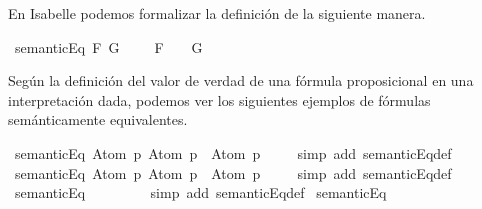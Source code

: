 \begin{isabellebody}
\begin{isamarkuptext}
  En Isabelle podemos formalizar la definición de la siguiente manera.%
\end{isamarkuptext}\isamarkuptrue%
\isamarkupfalse%
\ {\isachardoublequoteopen}semanticEq\ F\ G\ {\isasymequiv}\ {\isasymforall}{\isasymA}{\isachardot}\ {\isacharparenleft}{\isasymA}\ {\isasymTurnstile}\ F{\isacharparenright}\ {\isasymlongleftrightarrow}\ {\isacharparenleft}{\isasymA}\ {\isasymTurnstile}\ G{\isacharparenright}{\isachardoublequoteclose}%
\begin{isamarkuptext}%
Según la definición del valor de verdad de una fórmula proposicional en una 
  interpretación dada, podemos ver los siguientes ejemplos de fórmulas semánticamente equivalentes.%
\end{isamarkuptext}\isamarkuptrue%
\isamarkupfalse%
\ {\isachardoublequoteopen}semanticEq\ {\isacharparenleft}Atom\ p{\isacharparenright}\ {\isacharparenleft}{\isacharparenleft}Atom\ p{\isacharparenright}\ \isactrlbold {\isasymor}\ {\isacharparenleft}Atom\ p{\isacharparenright}{\isacharparenright}{\isachardoublequoteclose}\ \isanewline
%
\isadelimproof
\ \ %
\endisadelimproof
%
\isatagproof
{}\isamarkupfalse%
\ {\isacharparenleft}simp\ add{\isacharcolon}\ semanticEq{\isacharunderscore}def{\isacharparenright}%
\endisatagproof
{\isafoldproof}%
%
\isadelimproof
\isanewline
%
\endisadelimproof
\isanewline
{}\isamarkupfalse%
\ {\isachardoublequoteopen}semanticEq\ {\isacharparenleft}Atom\ p{\isacharparenright}\ {\isacharparenleft}{\isacharparenleft}Atom\ p{\isacharparenright}\ \isactrlbold {\isasymand}\ {\isacharparenleft}Atom\ p{\isacharparenright}{\isacharparenright}{\isachardoublequoteclose}\ \isanewline
%
\isadelimproof
\ \ %
\endisadelimproof
%
\isatagproof
{}\isamarkupfalse%
\ {\isacharparenleft}simp\ add{\isacharcolon}\ semanticEq{\isacharunderscore}def{\isacharparenright}%
\endisatagproof
{\isafoldproof}%
%
\isadelimproof
\isanewline
%
\endisadelimproof
\isanewline
{}\isamarkupfalse%
\ {\isachardoublequoteopen}semanticEq\ {\isasymbottom}\ {\isacharparenleft}{\isasymbottom}\ \isactrlbold {\isasymand}\ {\isasymbottom}{\isacharparenright}{\isachardoublequoteclose}\ \isanewline
%
\isadelimproof
\ \ %
\endisadelimproof
%
\isatagproof
{}\isamarkupfalse%
\ {\isacharparenleft}simp\ add{\isacharcolon}\ semanticEq{\isacharunderscore}def{\isacharparenright}%
\endisatagproof
{\isafoldproof}%
%
\isadelimproof
\isanewline
%
\endisadelimproof
\isanewline
{}\isamarkupfalse%
\ {\isachardoublequoteopen}semanticEq\ {\isasymbottom}\ {\isacharparenleft}{\isasymbottom}\ \isactrlbold {\isasymor}\ {\isasymbottom}{\isacharparenright}{\isachardoublequoteclose}\ \isanewline

\end{isabellebody}

